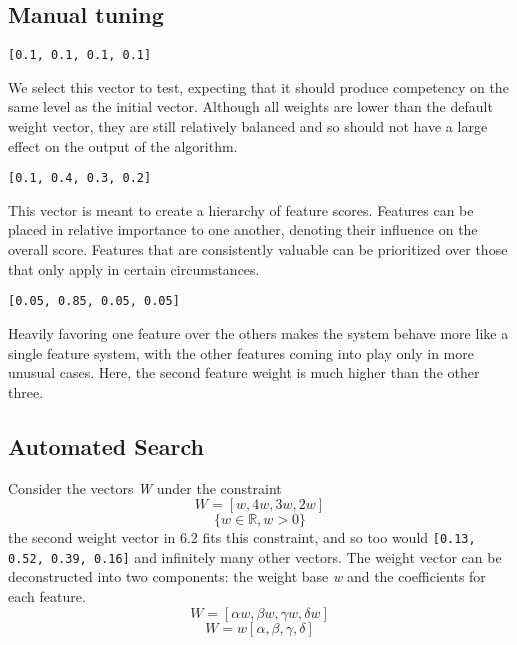 \documentclass[11pt,letterpaper]{article}
\begin{document}
\subsection{Manual tuning}

\noindent\texttt{[0.1, 0.1, 0.1, 0.1]}

We select this vector to test, expecting that it should produce competency on the same level as the initial vector. Although all weights are lower than the default weight vector, they are still relatively balanced and so should not have a large effect on the output of the algorithm.

\noindent\texttt{[0.1, 0.4, 0.3, 0.2]}

This vector is meant to create a hierarchy of feature scores. Features can be placed in relative importance to one another, denoting their influence on the overall score. Features that are consistently valuable can be prioritized over those that only apply in certain circumstances. 

\noindent\texttt{[0.05, 0.85, 0.05, 0.05]}

Heavily favoring one feature over the others makes the system behave more like a single feature system, with the other features coming into play only in more unusual cases. Here, the second feature weight is much higher than the other three.

\subsection{Automated Search}

Consider the vectors \textit{W} under the constraint
\begin{displaymath}
W = [w, 4w, 3w, 2w]
\end{displaymath}
\begin{displaymath}
\{w \in \mathbb{R},  w > 0\}
\end{displaymath}
\noindent the second weight vector in 6.2 fits this constraint, and so too would \texttt{[0.13, 0.52, 0.39, 0.16]} and infinitely many other vectors. 
The weight vector can be deconstructed into two components: the weight base \textit{w} and the coefficients for each feature. 
\begin{displaymath}
W = [\alpha w, \beta w, \gamma w, \delta w]
\end{displaymath}
\begin{displaymath}
W = w  [\alpha, \beta, \gamma, \delta]
\end{displaymath}
\end{document}
